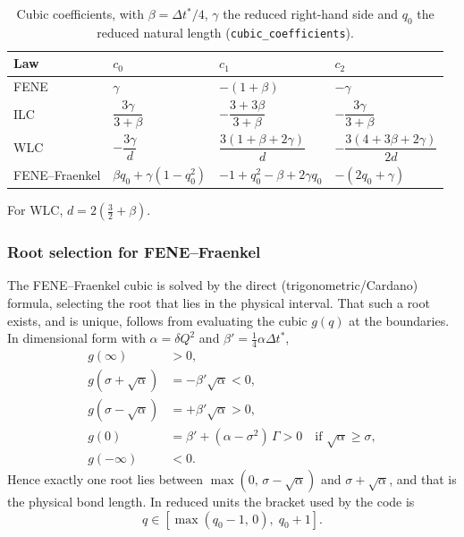 \documentclass[11pt,a4paper]{report}
\newcommand{\dt}{\Delta t^{*}}
\newcommand{\code}[1]{\texttt{\seqsplitcode{#1}}}
\newcommand{\seqsplitcode}[1]{#1}
\begin{document}
\begin{table}[ht]
\centering
\caption{Cubic coefficients, with $\beta = \dt/4$, $\gamma$ the reduced
right-hand side and $q_0$ the reduced natural length
(\code{cubic\_coefficients}).}
\label{tab:cubic-coeffs}
\renewcommand{\arraystretch}{1.5}
\begin{tabular}{@{}llll@{}}
\toprule
Law & $c_0$ & $c_1$ & $c_2$ \\
\midrule
FENE & $\gamma$ & $-(1+\beta)$ & $-\gamma$ \\
ILC  & $\dfrac{3\gamma}{3+\beta}$ & $-\dfrac{3+3\beta}{3+\beta}$ & $-\dfrac{3\gamma}{3+\beta}$ \\
WLC  & $-\dfrac{3\gamma}{d}$ & $\dfrac{3(1+\beta+2\gamma)}{d}$ & $-\dfrac{3(4+3\beta+2\gamma)}{2d}$ \\
FENE--Fraenkel & $\beta q_0 + \gamma(1-q_0^2)$ & $-1+q_0^2-\beta+2\gamma q_0$ & $-(2q_0+\gamma)$ \\
\bottomrule
\end{tabular}

\vspace{0.5em}
{\footnotesize For WLC, $d = 2\left(\tfrac{3}{2}+\beta\right)$.}
\end{table}

\subsubsection{Root selection for FENE--Fraenkel}

The FENE--Fraenkel cubic is solved by the direct (trigonometric/Cardano) formula,
selecting the root that lies in the physical interval. That such a root exists,
and is unique, follows from evaluating the cubic $g(q)$ at the boundaries. In
dimensional form with $\alpha = \delta Q^2$ and $\beta' = \tfrac14\alpha\dt$,
\begin{align}
  g(\infty) &> 0, \\
  g(\sigma+\sqrt{\alpha}) &= -\beta'\sqrt{\alpha} < 0, \\
  g(\sigma-\sqrt{\alpha}) &= +\beta'\sqrt{\alpha} > 0, \\
  g(0) &= \beta' + (\alpha-\sigma^2)\,\Gamma > 0 \quad\text{if } \sqrt{\alpha}\ge\sigma, \\
  g(-\infty) &< 0 .
\end{align}
Hence exactly one root lies between $\max(0,\,\sigma-\sqrt{\alpha})$ and
$\sigma+\sqrt{\alpha}$, and that is the physical bond length. In reduced units
the bracket used by the code is
\begin{equation}
  q \in \left[\max(q_0-1,\,0),\; q_0+1\right].
  \label{eq:ff-bracket}
\end{equation}
\end{document}
